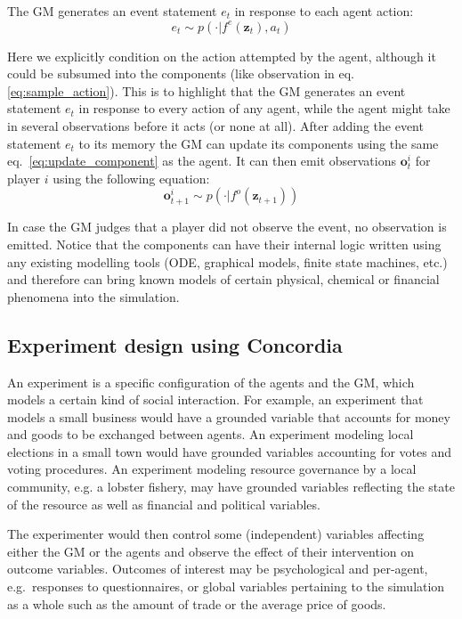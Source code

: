 \documentclass[11pt, a4paper, logo, twocolumn, internal, copyright, numbering]{googledeepmind}
\begin{document}
The GM generates an event statement $e_t$ in response to each agent action:
\begin{equation}
    e_t \sim p (\cdot|f^e(\mathbf{z}_t), a_t)
    \label{eq:event_sample}
\end{equation}

Here we explicitly condition on the action attempted by the agent, although it could be subsumed into the components (like observation in eq.\ref{eq:sample_action}). This is to highlight that the GM generates an event statement $e_t$ in response to every action of any agent, while the agent might take in several observations before it acts (or none at all). After adding the event statement $e_t$ to its memory the GM can update its components using the same eq.~\ref{eq:update_component} as the agent. It can then emit observations $\mathbf{o}^i_t$ for player $i$ using the following equation: 
\begin{equation}
    \mathbf{o}^i_{t+1} \sim p (\cdot|f^o(\mathbf{z}_{t+1}))
    \label{eq:event_sample}
\end{equation}

In case the GM judges that a player did not observe the event, no observation is emitted.  Notice that the components can have their internal logic written using any existing modelling tools (ODE, graphical models, finite state machines, etc.) and therefore can bring known models of certain physical, chemical or financial phenomena into the simulation. 

\subsection{Experiment design using Concordia}\label{section:design}

An experiment is a specific configuration of the agents and the GM, which models a certain kind of social interaction. For example, an experiment that models a small business would have a grounded variable that accounts for money and goods to be exchanged between agents. An experiment modeling local elections in a small town would have grounded variables accounting for votes and voting procedures. An experiment modeling resource governance by a local community, e.g. a lobster fishery, may have grounded variables reflecting the state of the resource as well as financial and political variables.

The experimenter would then control some (independent) variables affecting either the GM or the agents and observe the effect of their intervention on outcome variables. Outcomes of interest may be psychological and per-agent, e.g.~responses to questionnaires, or global variables pertaining to the simulation as a whole such as the amount of trade or the average price of goods.
\end{document}
